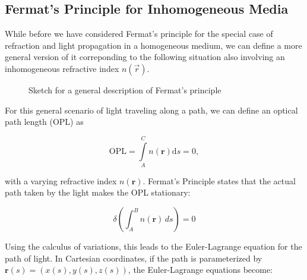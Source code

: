 \documentclass[
  a4paper,
]{book}
\begin{document}
\subsection{Fermat's Principle for Inhomogeneous
Media}\label{fermats-principle-for-inhomogeneous-media}

While before we have considered Fermat's principle for the special case
of refraction and light propagation in a homogeneous medium, we can
define a more general version of it correponding to the following
situation also involving an inhomogeneous refractive index
\(n(\vec{r})\).

\begin{figure}


\caption{\label{fig-fermat-general}Sketch for a general description of
Fermat's principle}

\end{figure}%

For this general scenario of light traveling along a path, we can define
an optical path length (OPL) as

\begin{equation}
\text{OPL} = \int\limits_{A}^{C} n(\mathbf{r}) \mathrm ds=0,
\end{equation}

with a varying refractive index \(n(\mathbf{r})\). Fermat's Principle
states that the actual path taken by the light makes the OPL stationary:

\[
\delta \left( \int_A^B n(\mathbf{r}) \, ds \right) = 0
\]

Using the calculus of variations, this leads to the Euler-Lagrange
equation for the path of light. In Cartesian coordinates, if the path is
parameterized by \(\mathbf{r}(s) = (x(s), y(s), z(s))\), the
Euler-Lagrange equations become:
\end{document}
